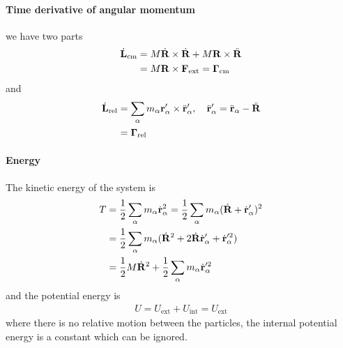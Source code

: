 \documentclass[../main.tex]{subfiles}
\begin{document}
\paragraph*{Time derivative of angular momentum} we have two parts
\begin{align*}
    \dot{\vb L}_{\text{cm}} &= M \dot{\vb R} \times \dot{\vb R} + M \vb R \times \ddot{\vb R} \\
    &= M \vb R \times \vb F_{\text{ext}} = \vb \Gamma_{\text{cm}} 
\end{align*}
and
\begin{align*}
    \dot{\vb L}_{\text{rel}} &= \sum_\alpha m_\alpha \vb r_\alpha' \times \ddot{\vb r}_\alpha', 
    \quad \ddot{\vb r}_\alpha' = \ddot{\vb r}_\alpha - \ddot{\vb R} \\
    &= \vb \Gamma_{\text{rel}}
\end{align*}
\paragraph*{Energy} The kinetic energy of the system is
\begin{align*}
    T &= \frac{1}{2} \sum_\alpha m_\alpha \dot{\vb r}_\alpha^2 = \frac{1}{2} \sum_\alpha m_\alpha(\dot{\vb R} + \dot{\vb r}_\alpha')^2 \\
    &= \frac{1}{2} \sum_\alpha m_\alpha (\dot{\vb R}^2 + 2\dot{\vb R} \dot{\vb r}_\alpha' + \dot{\vb r}_\alpha'^2) \\
    &= \frac{1}{2} M \dot{\vb R}^2 + \frac{1}{2} \sum_\alpha m_\alpha \dot{\vb r}_\alpha'^2
\end{align*}
and the potential energy is
\begin{align*}
    U = U_{\text{ext}} + U_{\text{int}} = U_{\text{ext}}
\end{align*}
where there is no relative motion between the particles, the internal potential energy is a constant
which can be ignored. 
\end{document}

